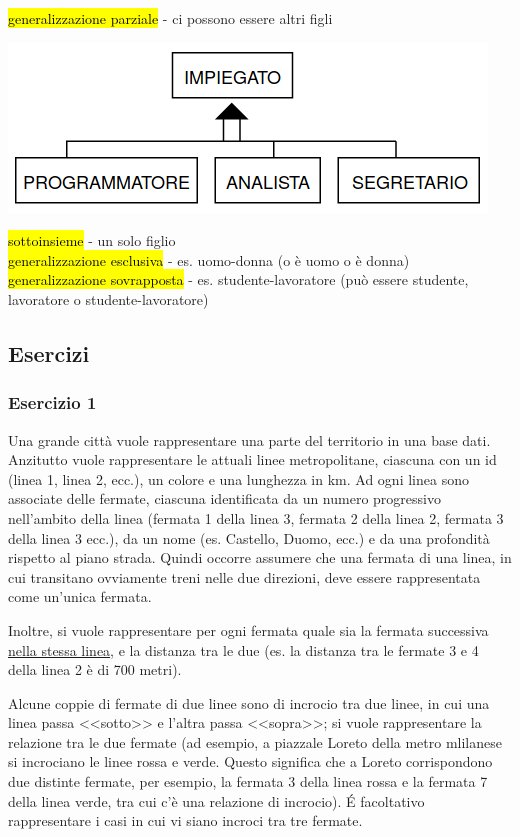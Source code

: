 \documentclass[a4paper]{article}
\begin{document}
\hl{generalizzazione parziale} - ci possono essere altri figli
\begin{center}
      \includegraphics[scale=0.5]{img/er6.png}
\end{center}
\hl{sottoinsieme} - un solo figlio\medskip\\
\hl{generalizzazione esclusiva} - es. uomo-donna (o è uomo o è donna)\medskip\\
\hl{generalizzazione sovrapposta} - es. studente-lavoratore (può essere studente, lavoratore o studente-lavoratore)

\subsection{Esercizi}
\subsubsection{Esercizio 1}
Una grande città vuole rappresentare una parte del territorio in una base dati. Anzitutto vuole rappresentare le attuali linee metropolitane, ciascuna con un id (linea 1, linea 2, ecc.), un colore e una lunghezza in km. Ad ogni linea sono associate delle fermate, ciascuna identificata da un numero progressivo nell'ambito della linea (fermata 1 della linea 3, fermata 2 della linea 2, fermata 3 della linea 3 ecc.), da un nome (es. Castello, Duomo, ecc.) e da una profondità rispetto al piano strada. Quindi occorre assumere che una fermata di una linea, in cui transitano ovviamente treni nelle due direzioni, deve essere rappresentata come un'unica fermata.

Inoltre, si vuole rappresentare per ogni fermata quale sia la fermata successiva \underline{nella stessa linea}, e la distanza tra le due (es. la distanza tra le fermate 3 e 4 della linea 2 è di 700 metri).

Alcune coppie di fermate di due linee sono di incrocio tra due linee, in cui una linea passa <<sotto>> e l'altra passa <<sopra>>; si vuole rappresentare la relazione tra le due fermate (ad esempio, a piazzale Loreto della metro mlilanese si incrociano le linee rossa e verde. Questo significa che a Loreto corrispondono due distinte fermate, per esempio, la fermata 3 della linea rossa e la fermata 7 della linea verde, tra cui c'è una relazione di incrocio).
É facoltativo rappresentare i casi in cui vi siano incroci tra tre fermate.
\end{document}

